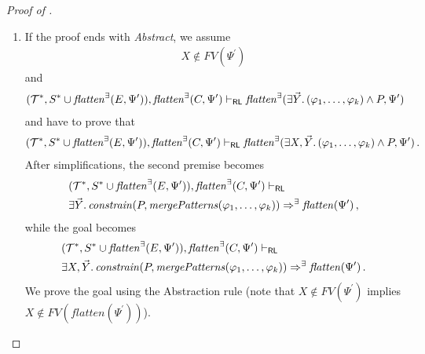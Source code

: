 \begin{proof}[Proof of ]
\begin{enumerate}
        
    \item If the proof ends with \emph{Abstract},
    we assume
    \begin{align*}
        X \not\in \mathit{FV}(\Psi^\prime)
    \end{align*}
    and
    \begin{align*}
                (\mathcal{T}^*, S^* \cup \mathit{flatten}^\exists(E, \Psi^\prime)), \mathit{flatten}^\exists(C, \Psi^\prime) \vdash_{\mathsf{RL}}
          \mathit{flatten}^\exists(\exists \vec{Y}.\, (\varphi_1, \ldots, \varphi_k) \land P, \Psi^\prime)
    \end{align*}
    and have to prove that
    \begin{align*}
                (\mathcal{T}^*, S^* \cup \mathit{flatten}^\exists(E, \Psi^\prime)), \mathit{flatten}^\exists(C, \Psi^\prime) \vdash_{\mathsf{RL}}
          \mathit{flatten}^\exists(\exists X,\vec{Y}.\, (\varphi_1, \ldots, \varphi_k) \land P, \Psi^\prime) \, .
    \end{align*}
    After simplifications, the second premise becomes
    \begin{align*}
            &(\mathcal{T}^*, S^* \cup \mathit{flatten}^\exists(E, \Psi^\prime)), \mathit{flatten}^\exists(C, \Psi^\prime) \vdash_{\mathsf{RL}}
          \\& \exists \vec{Y}.\, \mathit{constrain}(P, \mathit{mergePatterns}(\varphi_1, \ldots, \varphi_k))
          \Rightarrow^\exists \mathit{flatten}(\Psi^\prime) \, ,
    \end{align*}
    while the goal becomes
    \begin{align*}
          &(\mathcal{T}^*, S^* \cup \mathit{flatten}^\exists(E, \Psi^\prime)), \mathit{flatten}^\exists(C, \Psi^\prime) \vdash_{\mathsf{RL}}
          \\&\exists X,\vec{Y}.\, \mathit{constrain}(P, \mathit{mergePatterns}(\varphi_1, \ldots, \varphi_k))
          \Rightarrow^\exists \mathit{flatten}(\Psi^\prime) \, .
    \end{align*}
    We prove the goal using the Abstraction rule
    (note that $X \not\in \mathit{FV}(\Psi^\prime)$ implies $X \not\in \mathit{FV}(\mathit{flatten}(\Psi^\prime))$).
    
    \end{enumerate}
\end{proof}
